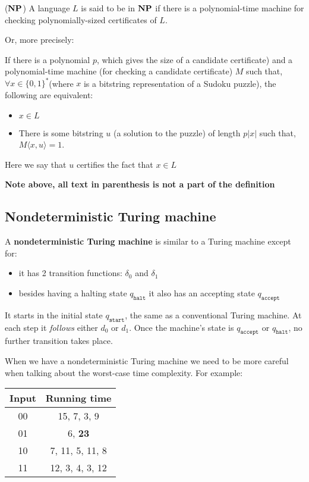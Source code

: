 \documentclass{article}
\begin{document}
  \begin{definition}($\bf{NP}$)
    A language $L$ is said to be in $\bf{NP}$ if there is a polynomial-time machine for checking polynomially-sized certificates of $L$.

    Or, more precisely:

    If there is a polynomial $p$, which gives the size of a candidate certificate) and a polynomial-time machine (for checking a candidate certificate) $M$ such that, $\forall x \in \{ 0,1 \}^{*} $(where $x$ is a bitstring representation of a Sudoku puzzle), the following are equivalent:

    \begin{itemize}
      \item $x\in L$
      \item There is some bitstring $u$ (a solution to the puzzle) of length $p|x|$ such that, $M \langle x,u \rangle = 1$.
    \end{itemize}

    Here we say that $u$ certifies the fact that $x \in L$
  \end{definition}

  \textbf{Note above, all text in parenthesis is not a part of the definition}

  \subsection{Nondeterministic Turing machine}


  A \textbf{nondeterministic Turing machine} is similar to a Turing machine except for:
  \begin{itemize}
    \item it has 2 transition functions: $\delta_{0}$ and $\delta_{1}$
          \item besides having a halting state $q_{\texttt{halt} }$ it also has an accepting state $q_{\texttt{accept} }$
  \end{itemize}

  It starts in the initial state $q_{\texttt{start} }$, the same as a conventional Turing machine. At each step it \textit{follows} either $d_{0 }$ or $d_{1}$. Once the machine's state is $q_{\texttt{accept} }$ or $q_{\texttt{halt} }$, no further transition takes place.


  When we have a nondeterministic Turing machine we need to be more careful when talking about the worst-case time complexity.
  For example:


\begin{center}
 \begin{tabular}{|c|c|}
 \hline
 Input & Running time\\ [0.5ex]
 \hline\hline
 00 & 15, 7, 3, 9\\
 \hline
 01 & 6, \textbf{23}\\
 \hline
 10 & 7, 11, 5, 11, 8 \\
 \hline
 11 & 12, 3, 4, 3, 12\\
 \hline
\end{tabular}
\end{center}
\end{document}
